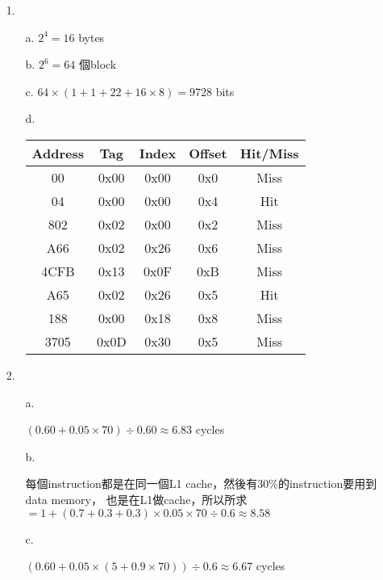 \documentclass{article}
\begin{document}
\begin{enumerate}
	\item[1.]

		\begin{enumerate}
			\item[a.] \(2^4 = 16\) bytes
			\item[b.] \(2^6 = 64\) 個block
			\item[c.] \(64 \times (1 + 1 + 22 + 16 \times 8) = 9728\) bits
			\item[d.] \

				\begin{tabular}[h]{|c|c|c|c|c|}
					\hline
					Address & Tag  & Index & Offset & Hit/Miss \\
					\hline
					00      & 0x00 & 0x00  & 0x0    & Miss     \\
					\hline
					04      & 0x00 & 0x00  & 0x4    & Hit      \\
					\hline
					802     & 0x02 & 0x00  & 0x2    & Miss     \\
					\hline
					A66     & 0x02 & 0x26  & 0x6    & Miss     \\
					\hline
					4CFB    & 0x13 & 0x0F  & 0xB    & Miss     \\
					\hline
					A65     & 0x02 & 0x26  & 0x5    & Hit      \\
					\hline
					188     & 0x00 & 0x18  & 0x8    & Miss     \\
					\hline
					3705    & 0x0D & 0x30  & 0x5    & Miss     \\
					\hline
				\end{tabular}
		\end{enumerate}

	\item[2.]

		\begin{enumerate}
			\item[a.]

				\((0.60 + 0.05 \times 70) \div 0.60 \approx 6.83\) cycles

			\item[b.]

				每個instruction都是在同一個L1 cache，然後有30\%的instruction要用到data memory，
				也是在L1做cache，所以所求
				\(= 1 + (0.7 + 0.3 + 0.3) \times 0.05 \times 70 \div 0.6 \approx 8.58\)

			\item[c.]

				\((0.60 + 0.05 \times (5 + 0.9 \times 70)) \div 0.6 \approx 6.67\) cycles


\end{enumerate}
\end{enumerate}
\end{document}
